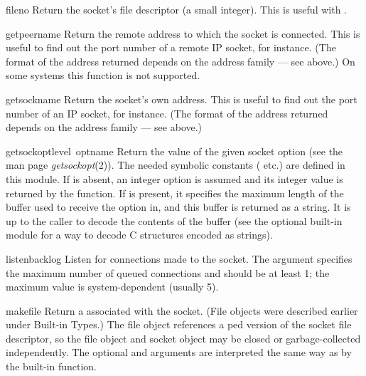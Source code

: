 \begin{funcdesc}{fileno}{}
Return the socket's file descriptor (a small integer).  This is useful
with .
\end{funcdesc}

\begin{funcdesc}{getpeername}{}
Return the remote address to which the socket is connected.  This is
useful to find out the port number of a remote IP socket, for instance.
(The format of the address returned depends on the address family ---
see above.)  On some systems this function is not supported.
\end{funcdesc}

\begin{funcdesc}{getsockname}{}
Return the socket's own address.  This is useful to find out the port
number of an IP socket, for instance.
(The format of the address returned depends on the address family ---
see above.)
\end{funcdesc}

\begin{funcdesc}{getsockopt}{level\, optname}
Return the value of the given socket option (see the \UNIX{} man page
{\it getsockopt}(2)).  The needed symbolic constants ( etc.)
are defined in this module.  If 
is absent, an integer option is assumed and its integer value
is returned by the function.  If  is present, it specifies
the maximum length of the buffer used to receive the option in, and
this buffer is returned as a string.  It is up to the caller to decode
the contents of the buffer (see the optional built-in module
 for a way to decode C structures encoded as strings).
\end{funcdesc}

\begin{funcdesc}{listen}{backlog}
Listen for connections made to the socket.  The  argument
specifies the maximum number of queued connections and should be at
least 1; the maximum value is system-dependent (usually 5).
\end{funcdesc}

\begin{funcdesc}{makefile}{}
Return a  associated with the socket.  (File objects
were described earlier under Built-in Types.)  The file object
references a ped version of the socket file descriptor, so
the file object and socket object may be closed or garbage-collected
independently.  The optional  and  arguments
are interpreted the same way as by the built-in
 function.
\end{funcdesc}

